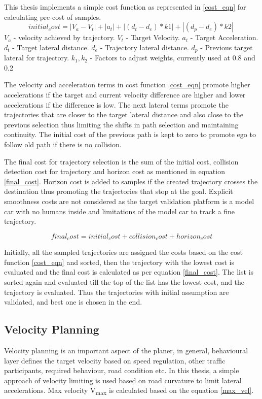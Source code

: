This thesis implements a simple cost function as represented in \ref{cost_eqn} for calculating pre-cost of samples.
\begin{equation}
initial_cost = |V_a - V_t| + |a_t| + | (d_t - d_e)*k1 | + | (d_p - d_e)*k2 |\
\label{cost_eqn}
\end{equation}
$V_a$ - velocity achieved by trajectory.
$V_t$ - Target Velocity.
$a_t$ - Target Acceleration.
$d_t$ - Target lateral distance.
$d_e$ - Trajectory lateral distance.
$d_p$ - Previous target lateral for trajectory.
$k_1,k_2$ - Factors to adjust weights, currently used at 0.8 and 0.2

The velocity and acceleration terms in cost function \ref{cost_eqn} promote higher accelerations if the target and current velocity difference are higher and lower accelerations if the difference is low. The next lateral terms promote the trajectories that are closer to the target lateral distance and also close to the previous selection thus limiting the shifts in path selection and maintaining continuity. The initial cost of the previous path is kept to zero to promote ego to follow old path if there is no collision. 

The final cost for trajectory selection is the sum of the initial cost, collision detection cost for trajectory and horizon cost as mentioned in equation \ref{final_cost}. Horizon cost is added to samples if the created trajectory crosses the destination thus promoting the trajectories that stop at the goal. Explicit smoothness costs are not considered as the target validation platform is a model car with no humans inside and limitations of the model car to track a fine trajectory. 

\begin{equation}
final_cost = initial_cost + collision_cost + horizon_cost
\label{final_cost}
\end{equation}

Initially, all the sampled trajectories are assigned the costs based on the cost function \ref{cost_eqn} and sorted, then the trajectory with the lowest cost is evaluated and the final cost is calculated as per equation \ref{final_cost}. The list is sorted again and evaluated till the top of the list has the lowest cost, and the trajectory is evaluated. Thus the trajectories with initial assumption are validated, and best one is chosen in the end. 

\subsection{Velocity Planning}
Velocity planning is an important aspect of the planer, in general, behavioural layer defines the target velocity based on speed regulation, other traffic participants, required behaviour, road condition etc. In this thesis, a simple approach of velocity limiting is used based on road curvature to limit lateral accelerations. Max velocity  V\textsubscript{max} is calculated based on the equation \ref{max_vel}. 

